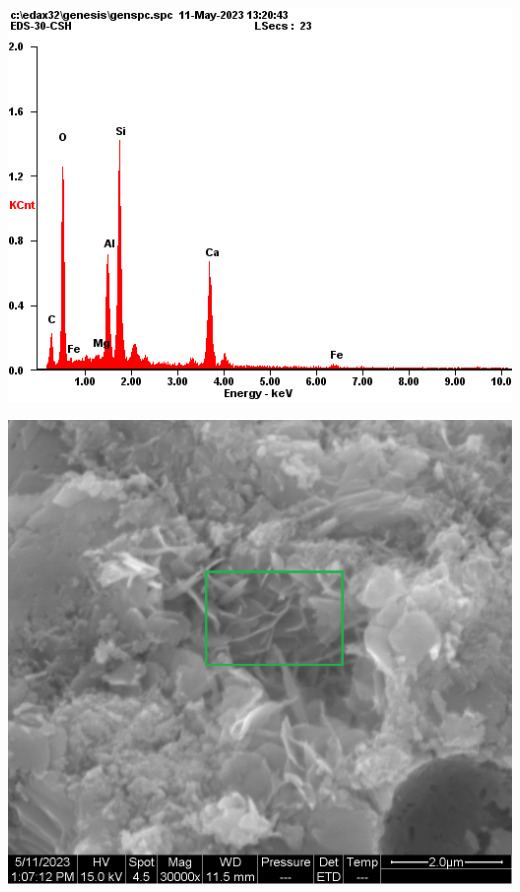\begin{minipage}{\textwidth}
  \begin{minipage}[b]{0.32\textwidth}
    \centering
    \includegraphics[width = \linewidth]{assets/spectrum/30-01-30000x-ETD-CSH.png}
  \end{minipage}
  \hfill
  \begin{minipage}[b]{0.32\textwidth}
    \centering
    \includegraphics[width = \linewidth]{assets/spectrum selection/30-01-30000x-CSH.png}

\end{minipage}
\end{minipage}
